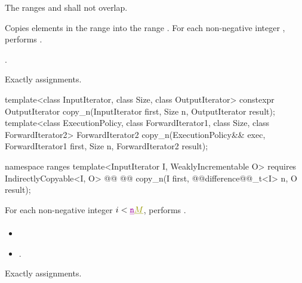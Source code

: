 \begin{itemdescr}
\pnum
\requires The ranges  and
 shall not overlap.

\pnum
\effects Copies elements in the range  into
the range .
For each non-negative integer 
,
performs .

\pnum
\returns {}.

\pnum
\complexity Exactly  assignments.
\end{itemdescr}

%
\begin{itemdecl}
template<class InputIterator, class Size, class OutputIterator>
  constexpr OutputIterator copy_n(InputIterator first, Size n,
                                  OutputIterator result);
template<class ExecutionPolicy, class ForwardIterator1, class Size, class ForwardIterator2>
  ForwardIterator2 copy_n(ExecutionPolicy&& exec,
                          ForwardIterator1 first, Size n,
                          ForwardIterator2 result);
\end{itemdecl}\begin{addedblock}\begin{itemdecl}
namespace ranges {
  template<InputIterator I, WeaklyIncrementable O>
    requires IndirectlyCopyable<I, O>
    @@
    @@
      copy_n(I first, @@difference@@_t<I> n, O result);
}
\end{itemdecl}\end{addedblock}


\begin{itemdescr}
\pnum
{}

\pnum
\effects For each non-negative integer
$i < \oldtxt{\tcode{n}}\newtxt{M}$, performs .

\pnum
\returns
\begin{itemize}
\item {}
\item {}
  .
\end{itemize}

\pnum
\complexity Exactly  assignments.
\end{itemdescr}

